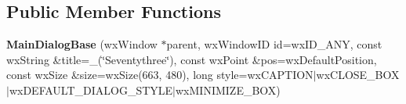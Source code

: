 \subsection*{Public Member Functions}
\begin{DoxyCompactItemize}
\item 
\mbox{\label{classMainDialogBase_abd08098623d736e85e3401b7e2901807}} 
{\bfseries Main\+Dialog\+Base} (wx\+Window $\ast$parent, wx\+Window\+ID id=wx\+I\+D\+\_\+\+A\+NY, const wx\+String \&title=\+\_\+(\char`\"{}Seventythree\char`\"{}), const wx\+Point \&pos=wx\+Default\+Position, const wx\+Size \&size=wx\+Size(663, 480), long style=wx\+C\+A\+P\+T\+I\+ON$\vert$wx\+C\+L\+O\+S\+E\+\_\+\+B\+OX$\vert$wx\+D\+E\+F\+A\+U\+L\+T\+\_\+\+D\+I\+A\+L\+O\+G\+\_\+\+S\+T\+Y\+LE$\vert$wx\+M\+I\+N\+I\+M\+I\+Z\+E\+\_\+\+B\+OX)
\end{DoxyCompactItemize}

